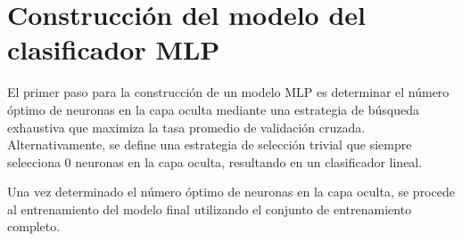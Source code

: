%
%
%
\section{Construcción del modelo del clasificador MLP}
%
El primer paso para la construcción de un modelo MLP es determinar el
número óptimo de neuronas en la capa oculta mediante una estrategia
de búsqueda exhaustiva que maximiza la tasa \GM promedio de
validación cruzada.
Alternativamente, se define una estrategia de selección trivial que
siempre selecciona 0 neuronas en la capa oculta, resultando en un
clasificador lineal.

Una vez determinado el número óptimo de neuronas en la capa oculta,
se procede al entrenamiento del modelo final utilizando el conjunto
de entrenamiento completo.





